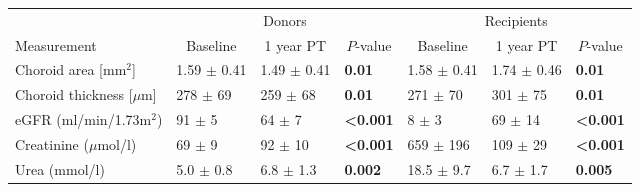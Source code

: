 \begin{tabular}{lllllll}
\toprule
 & \multicolumn{3}{c}{Donors} & \multicolumn{3}{c}{Recipients} \\ \cmidrule(l){2-4}\cmidrule(l){5-7}
\multirow{1}{*}{Measurement} & \multicolumn{1}{c}{Baseline} & \multicolumn{1}{c}{1 year PT} & \multicolumn{1}{c}{$\textit{P}$-value} & \multicolumn{1}{c}{Baseline} & \multicolumn{1}{c}{1 year PT} & \multicolumn{1}{c}{$\textit{P}$-value} \\ 
\midrule
Choroid area [mm$^2$] & 1.59 $\pm$ 0.41 & 1.49 $\pm$ 0.41 & \textbf{0.01} & 1.58 $\pm$ 0.41 & 1.74 $\pm$ 0.46 & \textbf{0.01} \\
Choroid thickness [$\mu$m] & 278 $\pm$ 69 & 259 $\pm$ 68 & \textbf{0.01} & 271 $\pm$ 70 & 301 $\pm$ 75 & \textbf{0.01} \\
\midrule
eGFR (ml/min/1.73m$^2$) & 91 $\pm$ 5 & 64 $\pm$ 7 & \textbf{<0.001} & 8 $\pm$ 3 & 69 $\pm$ 14 & \textbf{<0.001} \\
Creatinine ($\mu$mol/l) & 69 $\pm$ 9 & 92 $\pm$ 10 & \textbf{<0.001} & 659 $\pm$ 196 & 109 $\pm$ 29 & \textbf{<0.001} \\
Urea (mmol/l) & 5.0 $\pm$ 0.8 & 6.8 $\pm$ 1.3 & \textbf{0.002} & 18.5 $\pm$ 9.7 & 6.7 $\pm$ 1.7 &\textbf{0.005} \\
\bottomrule
\end{tabular}
